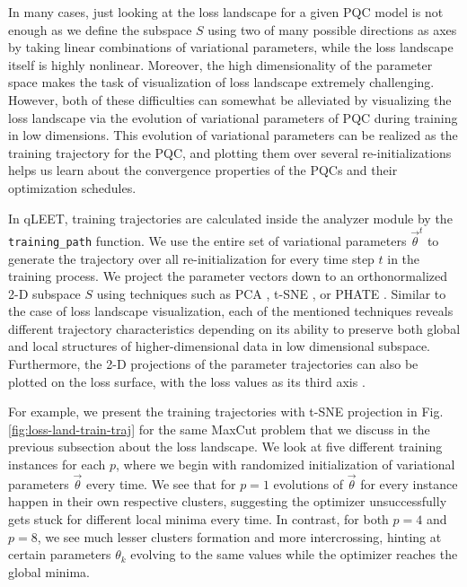 \documentclass[%
 reprint,
 amsmath,
 amssymb,
 showkeys,
 pra,
 floatfix,
]{revtex4-2}
\begin{document}
In many cases, just looking at the loss landscape for a given PQC model is not enough as we define the subspace $S$ using two of many possible directions as axes by taking linear combinations of variational parameters, while the loss landscape itself is highly nonlinear. Moreover, the high dimensionality of the parameter space makes the task of visualization of loss landscape extremely challenging. However, both of these difficulties can somewhat be alleviated by visualizing the loss landscape via the evolution of variational parameters of PQC during training in low dimensions. This evolution of variational parameters can be realized as the training trajectory for the PQC, and plotting them over several re-initializations helps us learn about the convergence properties of the PQCs and their optimization schedules. 

In qLEET, training trajectories are calculated inside the analyzer module by the \texttt{training\_path} function. We use the entire set of variational parameters $\vec{\theta}^{t}$ to generate the trajectory over all re-initialization for every time step $t$ in the training process. We project the parameter vectors down to an orthonormalized 2-D subspace $S$ using techniques such as PCA \cite{Jolliffe2016}, t-SNE \cite{NIPS2002_6150ccc6}, or PHATE \cite{Moon2019}. Similar to the case of loss landscape visualization, each of the mentioned techniques reveals different trajectory characteristics depending on its ability to preserve both global and local structures of higher-dimensional data in low dimensional subspace. Furthermore, the 2-D projections of the parameter trajectories can also be plotted on the loss surface, with the loss values as its third axis \citep{training-trajectories}.

For example, we present the training trajectories with t-SNE projection in Fig. \ref{fig:loss-land-train-traj} for the same MaxCut problem that we discuss in the previous subsection about the loss landscape. We look at five different training instances for each $p$, where we begin with randomized initialization of variational parameters $\vec{\theta}$ every time. We see that for $p=1$ evolutions of $\vec{\theta}$ for every instance happen in their own respective clusters, suggesting the optimizer unsuccessfully gets stuck for different local minima every time. In contrast, for both $p=4$ and $p=8$, we see much lesser clusters formation and more intercrossing, hinting at certain parameters $\theta_k$ evolving to the same values while the optimizer reaches the global minima. 
\end{document}
